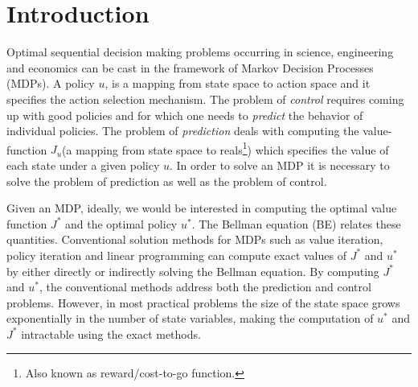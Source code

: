 \section{Introduction}\label{intro}
Optimal sequential decision making problems occurring in science, engineering and economics can be cast in the framework of Markov Decision Processes (MDPs). A policy $u$, is a mapping from state space to action space and it specifies the action selection mechanism. The problem of \emph{control} requires coming up with good policies and for which one needs to \emph{predict} the behavior of individual policies. The problem of \emph{prediction} deals with computing the value-function $J_u$(a mapping from state space to reals\footnote{Also known as reward/cost-to-go function.}) which specifies the value of each state under a given policy $u$. In order to solve an MDP it is necessary to solve the problem of prediction as well as the problem of control.

Given an MDP, ideally, we would be interested in computing the optimal value function $J^*$ and the optimal policy $u^*$. The Bellman equation (BE) relates these quantities. Conventional solution methods for MDPs \cite{BertB} such as value iteration, policy iteration and linear programming can compute exact values of $J^*$ and $u^*$ by either directly or indirectly solving the Bellman equation. By computing $J^*$ and $u^*$, the conventional methods address both the prediction and control problems. However, in most practical problems the size of the state space grows exponentially in the number of state variables, making the computation of $u^*$ and $J^*$ intractable using the exact methods.

